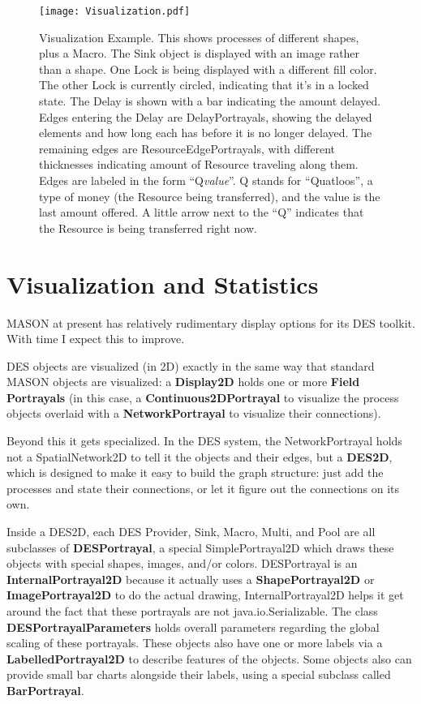 \documentclass[twoside,10pt]{article}
\begin{document}
\begin{figure}
\vspace{-3em}\texttt{[image: Visualization.pdf]}
\vspace{-2em}
\caption{Visualization Example.  This shows processes of different shapes, plus a Macro.  The Sink object is displayed with an image rather than a shape.  One Lock is being displayed with a different fill color.  The other Lock is currently circled, indicating that it's in a locked state.  The Delay is shown with a bar indicating the amount delayed.  Edges entering the Delay are DelayPortrayals, showing the delayed elements and how long each has before it is no longer delayed.  The remaining edges are ResourceEdgePortrayals, with different thicknesses indicating amount of Resource traveling along them.  Edges are labeled in the form ``Q{\it value}''.  Q stands for ``Quatloos'', a type of money (the Resource being transferred), and the value is the last amount offered.  A little arrow next to the ``Q'' indicates that the Resource is being transferred right now.}
\label{visualization}
\end{figure}

\section{Visualization and Statistics}

MASON at present has relatively rudimentary display options for its DES toolkit.  With time I expect this to improve.

DES objects are visualized (in 2D) exactly in the same way that standard MASON objects are visualized: a {\bf Display2D} holds one or more {\bf Field Portrayals} (in this case, a {\bf Continuous2DPortrayal} to visualize the process objects overlaid with a {\bf NetworkPortrayal} to visualize their connections).  

Beyond this it gets specialized.  In the DES system, the NetworkPortrayal holds not a SpatialNetwork2D to tell it the objects and their edges, but a {\bf DES2D}, which is designed to make it easy to build the graph structure: just add the processes and state their connections, or let it figure out the connections on its own.   

Inside a DES2D, each DES Provider, Sink, Macro, Multi, and Pool are all subclasses of {\bf DESPortrayal}, a special SimplePortrayal2D which draws these objects with special shapes, images, and/or colors.    DESPortrayal is an {\bf InternalPortrayal2D} because it actually uses a {\bf ShapePortrayal2D} or {\bf ImagePortrayal2D} to do the actual drawing, InternalPortrayal2D helps it get around the fact that these portrayals are not java.io.Serializable.  The class {\bf DESPortrayalParameters} holds overall parameters regarding the global scaling of these portrayals.  These objects also have one or more labels via a {\bf LabelledPortrayal2D} to describe features of the objects.  Some objects also can provide small bar charts alongside their labels, using a special subclass called {\bf BarPortrayal}.
\end{document}
